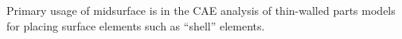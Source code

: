 Primary usage of midsurface is in the CAE analysis of thin-walled parts models for placing surface elements such as ``shell'' elements.
